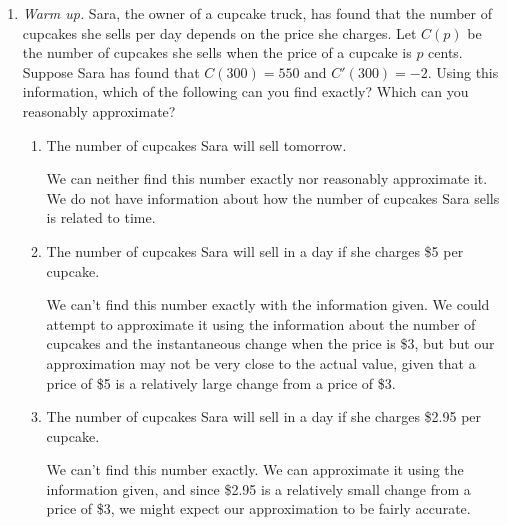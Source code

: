\documentclass{article}
\begin{document}
\begin{enumerate}
\item  \label{interpret-derivatives-cupcakes}


  \emph{Warm up.} Sara, the owner of a cupcake truck, has found that the number of cupcakes she sells per day depends on the price she charges. Let $C(p)$ be the number of cupcakes she sells when the price of a cupcake is $p$ cents. Suppose Sara has found that $C(300) = 550$ and $C'(300) = -2$. Using this information, which of the following can you find exactly? Which can you reasonably approximate?
  \begin{enumerate}
  \item
    \begin{problem}[\vfill]
      The number of cupcakes Sara will sell tomorrow.
    \end{problem}

    \begin{solution}
      We can neither find this number exactly nor reasonably approximate it. We do not have information about
      how the number of cupcakes Sara sells is related to time. 
    \end{solution}

  \item
    \begin{problem}[\vfill]
      The number of cupcakes Sara will sell in a day if she charges \$5 per cupcake.
    \end{problem}

    \begin{solution}
      We can't find this number exactly with the information given. We could attempt to approximate it
      using the information about the number of cupcakes and the instantaneous change when the price is \$3, but
      but our approximation may not be very close to the actual value, given that a price of \$5 is
      a relatively large change from a price of \$3.
    \end{solution}

  \item
    \begin{problem}[\vfill]
      The number of cupcakes Sara will sell in a day if she charges \$2.95 per cupcake.
    \end{problem}

    \begin{solution}
      We can't find this number exactly. We can approximate it using the information given, and since \$2.95
      is a relatively small change from a price of \$3, we might expect our approximation to be fairly accurate.
    \end{solution}


\end{enumerate}
\end{enumerate}
\end{document}
